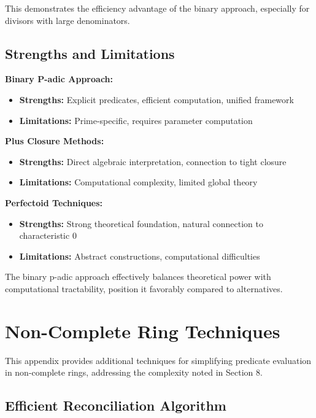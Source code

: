 This demonstrates the efficiency advantage of the binary approach, especially for divisors with large denominators.

\subsection{Strengths and Limitations}

\textbf{Binary P-adic Approach:}
\begin{itemize}
    \item \textbf{Strengths:} Explicit predicates, efficient computation, unified framework
    \item \textbf{Limitations:} Prime-specific, requires parameter computation
\end{itemize}

\textbf{Plus Closure Methods:}
\begin{itemize}
    \item \textbf{Strengths:} Direct algebraic interpretation, connection to tight closure
    \item \textbf{Limitations:} Computational complexity, limited global theory
\end{itemize}

\textbf{Perfectoid Techniques:}
\begin{itemize}
    \item \textbf{Strengths:} Strong theoretical foundation, natural connection to characteristic 0
    \item \textbf{Limitations:} Abstract constructions, computational difficulties
\end{itemize}

The binary p-adic approach effectively balances theoretical power with computational tractability, position it favorably compared to alternatives.

\section{Non-Complete Ring Techniques}\label{app:non-complete-rings}

This appendix provides additional techniques for simplifying predicate evaluation in non-complete rings, addressing the complexity noted in Section 8.

\subsection{Efficient Reconciliation Algorithm}

